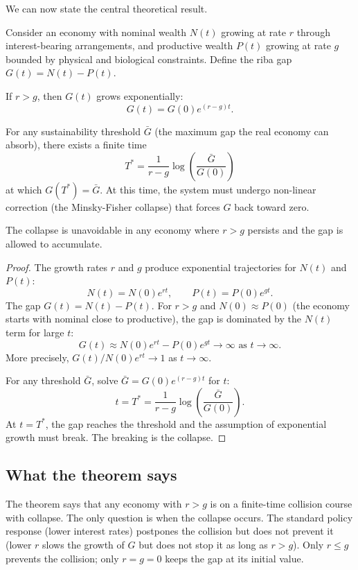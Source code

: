 We can now state the central theoretical result.

\begin{theorem}
\label{thm:riba-collapse}
Consider an economy with nominal wealth $N(t)$ growing at rate $r$
through interest-bearing arrangements, and productive wealth
$P(t)$ growing at rate $g$ bounded by physical and biological
constraints. Define the riba gap $G(t) = N(t) - P(t)$.

If $r > g$, then $G(t)$ grows exponentially:
\[
    G(t) = G(0) e^{(r-g)t}.
\]

For any sustainability threshold $\bar{G}$ (the maximum gap the
real economy can absorb), there exists a finite time
\[
    T^* = \frac{1}{r - g} \log\left(\frac{\bar{G}}{G(0)}\right)
\]
at which $G(T^*) = \bar{G}$. At this time, the system must
undergo non-linear correction (the Minsky-Fisher collapse) that
forces $G$ back toward zero.

The collapse is unavoidable in any economy where $r > g$ persists
and the gap is allowed to accumulate.
\end{theorem}

\begin{proof}
The growth rates $r$ and $g$ produce exponential trajectories for
$N(t)$ and $P(t)$:
\[
    N(t) = N(0) e^{rt}, \qquad P(t) = P(0) e^{gt}.
\]
The gap $G(t) = N(t) - P(t)$. For $r > g$ and $N(0) \approx P(0)$
(the economy starts with nominal close to productive), the gap is
dominated by the $N(t)$ term for large $t$:
\[
    G(t) \approx N(0) e^{rt} - P(0) e^{gt} \to \infty \text{ as } t \to \infty.
\]
More precisely, $G(t)/N(0) e^{rt} \to 1$ as $t \to \infty$.

For any threshold $\bar{G}$, solve $\bar{G} = G(0) e^{(r-g)t}$ for
$t$:
\[
    t = T^* = \frac{1}{r-g} \log\left(\frac{\bar{G}}{G(0)}\right).
\]
At $t = T^*$, the gap reaches the threshold and the assumption of
exponential growth must break. The breaking is the collapse.
\end{proof}

\subsection{What the theorem says}

The theorem says that any economy with $r > g$ is on a finite-time
collision course with collapse. The only question is when the
collapse occurs. The standard policy response (lower interest
rates) postpones the collision but does not prevent it (lower $r$
slows the growth of $G$ but does not stop it as long as $r > g$).
Only $r \leq g$ prevents the collision; only $r = g = 0$ keeps the
gap at its initial value.

